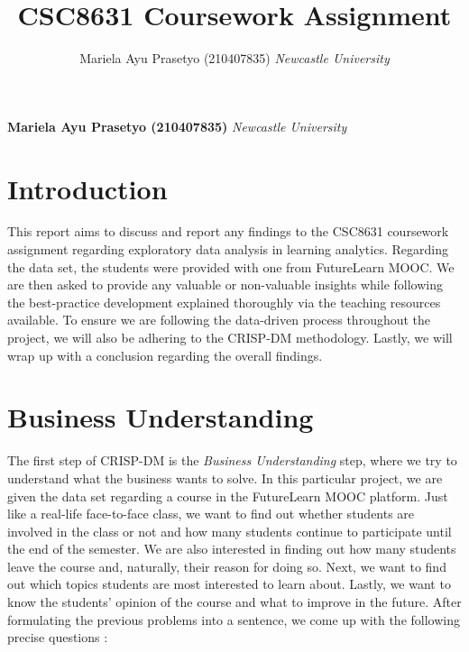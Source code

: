 \documentclass[12pt,]{article}
\title{CSC8631 Coursework Assignment  }
\author{\Large Mariela Ayu Prasetyo
(210407835)\vspace{0.05in} \newline\normalsize\emph{Newcastle
University}  }
\date{}
\newcommand*{\authorfont}{\fontfamily{phv}\selectfont}
\begin{document}
	
%    


{%
\setlength{\parindent}{0pt}
\thispagestyle{plain}
{\fontsize{18}{20}\selectfont\raggedright 
\maketitle  %

}

{
   \vskip 13.5pt\relax \normalsize\fontsize{11}{12} 
\textbf{\authorfont Mariela Ayu Prasetyo
(210407835)} \hskip 15pt \emph{\small Newcastle University}   

}

}






\vskip -8.5pt



\noindent  

\hypertarget{introduction}{%
\section{Introduction}\label{introduction}}

This report aims to discuss and report any findings to the CSC8631
coursework assignment regarding exploratory data analysis in learning
analytics. Regarding the data set, the students were provided with one
from FutureLearn MOOC. We are then asked to provide any valuable or
non-valuable insights while following the best-practice development
explained thoroughly via the teaching resources available. To ensure we
are following the data-driven process throughout the project, we will
also be adhering to the CRISP-DM methodology. Lastly, we will wrap up
with a conclusion regarding the overall findings.

\hypertarget{business-understanding}{%
\section{Business Understanding}\label{business-understanding}}

The first step of CRISP-DM is the \emph{Business Understanding} step,
where we try to understand what the business wants to solve. In this
particular project, we are given the data set regarding a course in the
FutureLearn MOOC platform. Just like a real-life face-to-face class, we
want to find out whether students are involved in the class or not and
how many students continue to participate until the end of the semester.
We are also interested in finding out how many students leave the course
and, naturally, their reason for doing so. Next, we want to find out
which topics students are most interested to learn about. Lastly, we
want to know the students' opinion of the course and what to improve in
the future. After formulating the previous problems into a sentence, we
come up with the following precise questions :
\end{document}
